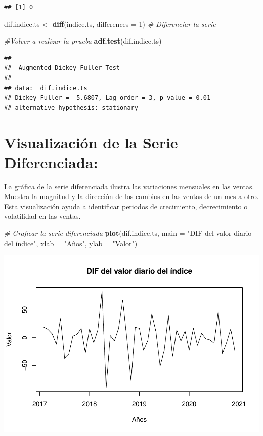 \documentclass[
]{book}
\newenvironment{Shaded}{\begin{snugshade}}{\end{snugshade}}
\newcommand{\AttributeTok}[1]{\textcolor[rgb]{0.13,0.29,0.53}{#1}}
\newcommand{\CommentTok}[1]{\textcolor[rgb]{0.56,0.35,0.01}{\textit{#1}}}
\newcommand{\DecValTok}[1]{\textcolor[rgb]{0.00,0.00,0.81}{#1}}
\newcommand{\FunctionTok}[1]{\textcolor[rgb]{0.13,0.29,0.53}{\textbf{#1}}}
\newcommand{\NormalTok}[1]{#1}
\newcommand{\OtherTok}[1]{\textcolor[rgb]{0.56,0.35,0.01}{#1}}
\newcommand{\StringTok}[1]{\textcolor[rgb]{0.31,0.60,0.02}{#1}}
\begin{document}
\begin{verbatim}
## [1] 0
\end{verbatim}

\begin{Shaded}
\begin{Highlighting}[]
\NormalTok{dif.indice.ts }\OtherTok{\textless{}{-}} \FunctionTok{diff}\NormalTok{(indice.ts, }\AttributeTok{differences =} \DecValTok{1}\NormalTok{) }\CommentTok{\# Diferenciar la serie}


\CommentTok{\#Volver a realizar la prueba}
\FunctionTok{adf.test}\NormalTok{(dif.indice.ts)}
\end{Highlighting}
\end{Shaded}

\begin{verbatim}
## 
##  Augmented Dickey-Fuller Test
## 
## data:  dif.indice.ts
## Dickey-Fuller = -5.6807, Lag order = 3, p-value = 0.01
## alternative hypothesis: stationary
\end{verbatim}

\section{Visualización de la Serie Diferenciada:}\label{visualizaciuxf3n-de-la-serie-diferenciada}

La gráfica de la serie diferenciada ilustra las variaciones mensuales en las ventas. Muestra la magnitud y la dirección de los cambios en las ventas de un mes a otro. Esta visualización ayuda a identificar periodos de crecimiento, decrecimiento o volatilidad en las ventas.

\begin{Shaded}
\begin{Highlighting}[]
\CommentTok{\# Graficar la serie diferenciada}
\FunctionTok{plot}\NormalTok{(dif.indice.ts,  }\AttributeTok{main =} \StringTok{"DIF del valor diario del índice"}\NormalTok{, }\AttributeTok{xlab =} \StringTok{"Años"}\NormalTok{, }\AttributeTok{ylab =} \StringTok{"Valor"}\NormalTok{)}
\end{Highlighting}
\end{Shaded}

\includegraphics{_main_files/figure-latex/unnamed-chunk-15-1.pdf}
\end{document}

